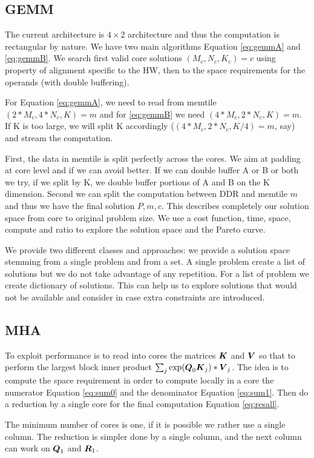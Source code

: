 \documentclass[journal]{IEEEtran}
\begin{document}
\subsection{GEMM}
The current architecture is $4\times 2$ architecture and thus the
computation is rectangular by nature. We have two main algorithms
Equation \ref{eq:gemmA} and \ref{eq:gemmB}. We search first valid core
solutions $(M_c,N_c,K_c)=c$ using property of alignment specific to
the HW, then to the space requirements for the operands (with double
buffering).

For Equation \ref{eq:gemmA}, we need to read from memtile
$(2*M_c,4*N_c,K)=m$ and for \ref{eq:gemmB} we need
$(4*M_c,2*N_c,K)=m$. If K is too large, we will split K accordingly
($(4*M_c,2*N_c,K/4)=m$, say) and stream the computation.

First, the data in memtile is split perfectly across the cores. We aim
at padding at core level and if we can avoid better.  If we can double
buffer A or B or both we try, if we split by K, we double buffer
portions of A and B on the K dimension. Second we can split the
computation between DDR and memtile $m$ and thus we have the final
solution $P,m,c$. This describes completely our solution space from
core to original problem size.  We use a cost function, time, space,
compute and ratio to explore the solution space and the Pareto curve.

We provide two different classes and approaches: we provide a solution
space stemming from a single problem and from a set. A single problem
create a list of solutions but we do not take advantage of any
repetition. For a list of problem we create dictionary of
solutions. This can help us to explore solutions that would not be
available and consider in case extra constraints are introduced.


\subsection{MHA}
To exploit performance is to read into cores the matrices ${\boldsymbol K}$ and
${\boldsymbol V}$ so that to perform the largest block inner product
$\sum_j\exp({\boldsymbol Q}_0{\boldsymbol K}_j)*{\boldsymbol V}_j$. The idea is to compute the
space requirement in order to compute locally in a core the numerator
Equation \ref{eq:sum0} and the denominator Equation
\ref{eq:sum1}. Then do a reduction by a single core for the final
computation Equation \ref{eq:resall}.

The minimum number of cores is one, if it is possible we rather use a
single column. The reduction is simpler done by a single column, and
the next column can work on ${\boldsymbol Q}_1$ and ${\boldsymbol R}_1$.
\end{document}
